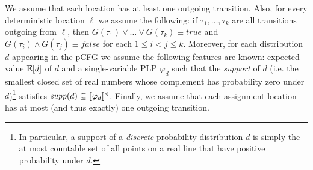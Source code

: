 \begin{definition}
We assume that each location has at least one outgoing transition.
Also, for every deterministic location $\ell$ we assume the following: if
$\tau_1,\dots,\tau_k$ are all transitions outgoing from $\ell$, then $G(\tau_1)
\vee \dots \vee G(\tau_k) \equiv \mathit{true}$ and $G(\tau_i) \wedge G(\tau_j)
\equiv \mathit{false}$ for each $1\leq i < j \leq k$. Moreover, for each 
distribution $d$ appearing in the 
pCFG we assume the following features are known: expected value $\mathbb{E}[d]$ of 
$d$ and a 
single-variable PLP $\varphi_d$ such that the \emph{support} of $d$ (i.e. the 
smallest 
closed set of real numbers whose complement has probability zero 
under $d$)\footnote{In particular, a support of a \emph{discrete} probability 
	distribution $d$ is simply the at most countable set of all points on a 
	real 
	line that have positive probability under $d$.} satisfies 
$\mathit{supp}(d)\subseteq\llbracket \varphi_d \rrbracket^{\triangleleft}$. Finally, we assume that each 
assignment location has at most (and thus exactly) one outgoing transition.
\end{definition}


